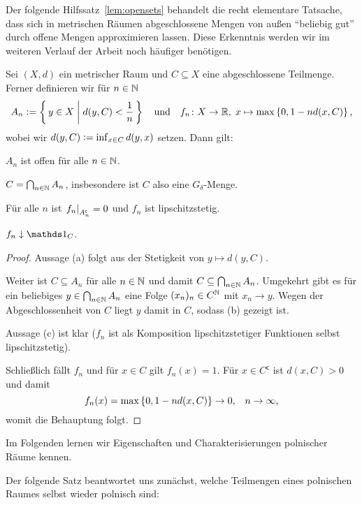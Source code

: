 \documentclass[../main/main.tex]{subfiles}
\begin{document}
	Der folgende Hilfssatz~\ref{lem:opensets} behandelt die recht elementare Tatsache, dass sich in metrischen Räumen 
	abgeschlossene Mengen von außen \enquote{beliebig gut} durch offene Mengen approximieren lassen. 
	Diese Erkenntnis werden wir im weiteren Verlauf der Arbeit noch häufiger benötigen.
	
	\begin{Hilfssatz}
		\label{lem:opensets}
		Sei $(X, d)$ ein metrischer Raum und $C \subseteq X$ eine abgeschlossene 
		Teilmenge. Ferner definieren wir für $n \in \mathbb{N}$
		$$ A_n \vcentcolon = \left\{\, y \in X \; \middle| \; d(y, C) < \frac{1}{n} \,\right\} \quad \text{und} \quad 
		f_n \colon X \to \mathbb{R}, \; x \mapsto \max \left\{0, 1-n d(x, C)\right\}  \text{,}$$
		wobei wir $d(y, C) \vcentcolon = \inf_{x \in C} d(y, x)$ setzen.
		Dann gilt:
		\begin{enumeratethm}
			\item $A_n$ ist offen für alle $n \in \mathbb{N}$.
			\item $C = \bigcap_{n \in \mathbb{N}} A_n$, insbesondere ist $C$ also eine $G_\delta$-Menge.
			\item Für alle $n$ ist $\left.f_n\right|_{A_n^\mathsf{c}} = 0$ und $f_n$ ist lipschitzstetig.
			\item $f_n \convdown \indfct_C$.
		\end{enumeratethm}
	\end{Hilfssatz}
	
	\begin{proof}
		Aussage (a) folgt aus der Stetigkeit von $y \mapsto d(y, C)$.
		
		Weiter ist $C \subseteq A_n$ für alle $n \in \mathbb{N}$ und damit 
		$C \subseteq \bigcap_{n \in \mathbb{N}} A_n$. 
		Umgekehrt gibt es für ein beliebiges $y \in \bigcap_{n \in \mathbb{N}} A_n$
		eine Folge $(x_n)_n \in C^{\mathbb{N}}$ mit $x_n \rightarrow y$. 
		Wegen der Abgeschlossenheit von $C$ liegt $y$ damit in $C$, sodass (b) gezeigt ist.
		
		Aussage (c) ist klar ($f_n$ ist als Komposition 
		lipschitzstetiger Funktionen selbst lipschitzstetig).
		
		Schließlich fällt $f_n$ und für $x \in C$ gilt $f_n(x) = 1$. 
		Für $x \in C^\mathsf{c}$ ist $d(x, C) > 0$ und damit
		$$f_n(x) = \max \left\{0, 1-n d(x, C)\right\} 
		\to 0 \text{,} \quad n \to \infty \text{,}$$
		womit die Behauptung folgt.
	\end{proof}

	Im Folgenden lernen wir Eigenschaften und Charakterisierungen polnischer Räume kennen.
	
	Der folgende Satz beantwortet uns zunächst, welche Teilmengen eines polnischen Raumes selbst wieder polnisch sind:
\end{document}
